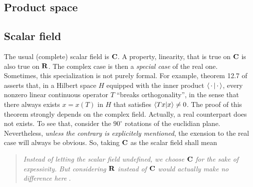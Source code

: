 \subsection*{Product space}
\subsection*{Scalar field}%
The usual (complete) scalar field is ${\mathbf C}$. %
A property, \eg linearity, that is true on ${\mathbf C}$ is also true on ${\mathbf R}$. %
The complex case is then a {\it special case} of the real one. %
Sometimes, this specialization is not purely formal. %
For example, theorem 12.7 of \cite{FA} asserts that, in a Hilbert space $H$ %
equipped with the inner product $\bra{\,\cdot\,}\ket{\,\cdot\,}$, %
every nonzero linear continuous operator $T$ ``breaks orthogonality'', %
in the sense that there always exists $x=x(T)$ in $H$ that satisfies %
%
  $\bra{Tx}\ket{x} \neq 0$. %
%
The proof of this theorem strongly depends on the complex field. %
Actually, a real counterpart does not exists. %
To see that, consider the $90^\circ$ rotations of the euclidian plane. %
%
Nevertheless, {\it unless the contrary is explicitely mentioned}, %
the exension to the real case will always be obvious. %
So, taking ${\mathbf C}$ as the scalar field shall mean %
%
\begin{quote}{\it %
Instead of letting the scalar field undefined, we choose ${\mathbf C}$ for the sake of %
expessivity. But considering ${\mathbf R}$ instead of %
${\mathbf C}$ would actually make no difference here
}. %
\end{quote}
%
